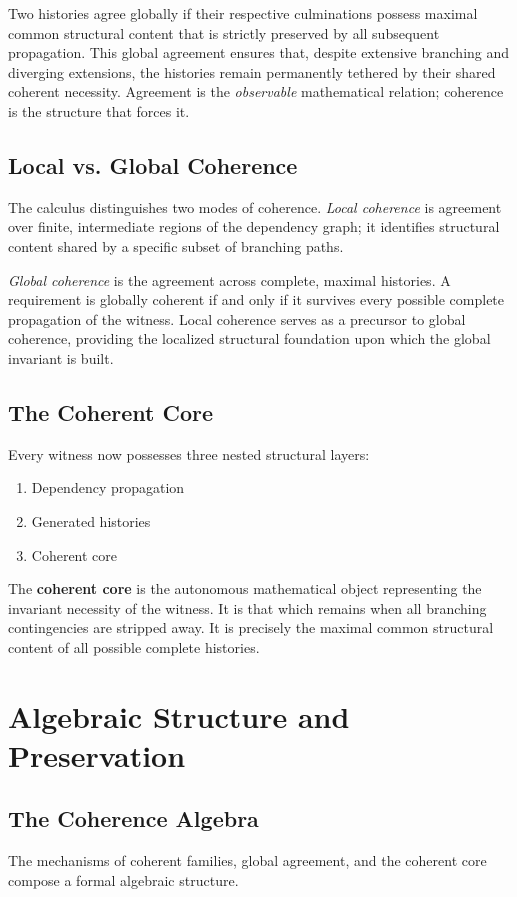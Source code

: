 \documentclass[12pt,anyside]{book}
\begin{document}
Two histories agree globally if their respective culminations possess maximal common structural content that is strictly preserved by all subsequent propagation. This global agreement ensures that, despite extensive branching and diverging extensions, the histories remain permanently tethered by their shared coherent necessity. Agreement is the \textit{observable} mathematical relation; coherence is the structure that forces it.

\subsection{Local vs. Global Coherence}
The calculus distinguishes two modes of coherence. \textit{Local coherence} is agreement over finite, intermediate regions of the dependency graph; it identifies structural content shared by a specific subset of branching paths. 

\textit{Global coherence} is the agreement across complete, maximal histories. A requirement is globally coherent if and only if it survives every possible complete propagation of the witness. Local coherence serves as a precursor to global coherence, providing the localized structural foundation upon which the global invariant is built.

\subsection{The Coherent Core}
Every witness now possesses three nested structural layers:
\begin{enumerate}
    \item Dependency propagation
    \item Generated histories
    \item Coherent core
\end{enumerate}

The \textbf{coherent core} is the autonomous mathematical object representing the invariant necessity of the witness. It is that which remains when all branching contingencies are stripped away. It is precisely the maximal common structural content of all possible complete histories.

\section{Algebraic Structure and Preservation}

\subsection{The Coherence Algebra}
The mechanisms of coherent families, global agreement, and the coherent core compose a formal algebraic structure. 
\end{document}
